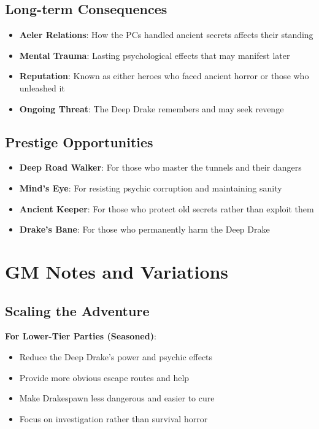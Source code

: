\documentclass[11pt]{article}
\begin{document}
\begin{itemize}
\subsection{Long-term Consequences}

\begin{itemize}
\item \textbf{Aeler Relations}: How the PCs handled ancient secrets affects their standing
\item \textbf{Mental Trauma}: Lasting psychological effects that may manifest later
\item \textbf{Reputation}: Known as either heroes who faced ancient horror or those who unleashed it
\item \textbf{Ongoing Threat}: The Deep Drake remembers and may seek revenge
\end{itemize}

\subsection{Prestige Opportunities}

\begin{itemize}
\item \textbf{Deep Road Walker}: For those who master the tunnels and their dangers
\item \textbf{Mind's Eye}: For resisting psychic corruption and maintaining sanity
\item \textbf{Ancient Keeper}: For those who protect old secrets rather than exploit them
\item \textbf{Drake's Bane}: For those who permanently harm the Deep Drake
\end{itemize}

\section{GM Notes and Variations}

\subsection{Scaling the Adventure}

\textbf{For Lower-Tier Parties (Seasoned)}:
\begin{itemize}
\item Reduce the Deep Drake's power and psychic effects
\item Provide more obvious escape routes and help
\item Make Drakespawn less dangerous and easier to cure
\item Focus on investigation rather than survival horror
\end{itemize}


\end{itemize}
\end{document}
